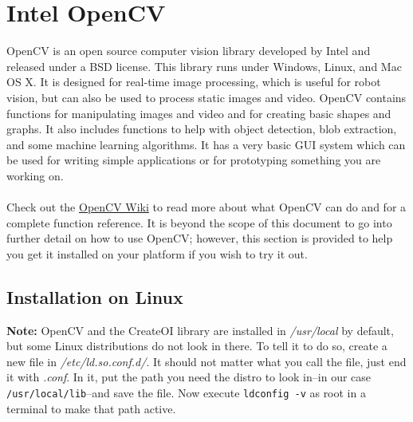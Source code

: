 \documentclass {article}
\begin{document}
\newpage


\section {Intel OpenCV}
OpenCV is an open source computer vision library developed by Intel and released under a BSD
license.  This library runs under Windows, Linux, and Mac OS X.  It is designed for real-time image
processing, which is useful for robot vision, but can also be used to process static images and
video.  OpenCV contains functions for manipulating images and video and for creating basic shapes
and graphs.  It also includes functions to help with object detection, blob extraction, and some
machine learning algorithms.  It has a very basic GUI system which can be used for writing simple
applications or for prototyping something you are working on. \\
\\
Check out the \href {http://opencvlibrary.sourceforge.net/} {OpenCV Wiki} to read more about what
OpenCV can do and for a complete function reference.  It is beyond the scope of this document to go
into further detail on how to use OpenCV; however, this section is provided to help you get it
installed on your platform if you wish to try it out.  \\

\subsection {Installation on Linux}
{\bf Note:} OpenCV and the CreateOI library are installed in {\it /usr/local} by default, but some
Linux distributions do not look in there.  To tell it to do so, create a new file in {\it
  /etc/ld.so.conf.d/}.  It should not matter what you call the file, just end it with {\it .conf}.
In it, put the path you need the distro to look in--in our case {\tt /usr/local/lib}--and save the
file.  Now execute {\tt ldconfig -v} as root in a terminal to make that path active.
\end{document}
